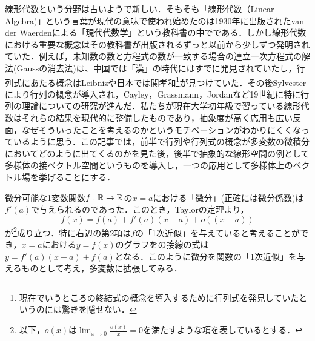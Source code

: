 線形代数という分野は古いようで新しい．そもそも「線形代数（Linear Algebra)」という言葉が現代の意味で使われ始めたのは1930年に出版されたvan der Waerdenによる「現代代数学」という教科書の中でである．しかし線形代数における重要な概念はその教科書が出版されるずっと以前から少しずつ発明されていた．例えば，未知数の数と方程式の数が一致する場合の連立一次方程式の解法(Gaussの消去法)は、中国では「漢」の時代にはすでに発見されていたし，行列式にあたる概念はLeibnizや日本では関孝和\footnote{現在でいうところの終結式の概念を導入するために行列式を発見していたというのには驚きを隠せない．}が見つけていた．その後Sylvesterにより行列の概念が導入され，Cayley，Grassmann，Jordanなど19世紀に特に行列の理論についての研究が進んだ．私たちが現在大学初年級で習っている線形代数はそれらの結果を現代的に整備したものであり，抽象度が高く応用も広い反面，なぜそういったことを考えるのかというモチベーションがわかりにくくなっているように思う．この記事では，前半で行列や行列式の概念が多変数の微積分においてどのように出てくるのかを見た後，後半で抽象的な線形空間の例として多様体の接ベクトル空間というものを導入し，一つの応用として多様体上のベクトル場を挙げることにする．

微分可能な1変数関数$f:{\mathbb R}\rightarrow{\mathbb R}$の$x=a$における「微分」(正確には微分係数)は$f'(a)$で与えられるのであった．このとき，Taylorの定理より，
$$
f(x)=f(a)+f'(a)(x-a)+o((x-a))
$$
が\footnote{以下，$o(x)$は$\lim_{x\rightarrow 0}\frac{o(x)}{x}=0$を満たすような項を表しているとする．}成り立つ．特に右辺の第2項は$f$の「1次近似」を与えていると考えることができ，$x=a$における$y=f(x)$のグラフをの接線の式は$y=f'(a)(x-a)+f(a)$となる．このように微分を関数の「1次近似」を与えるものとして考え，多変数に拡張してみる．



